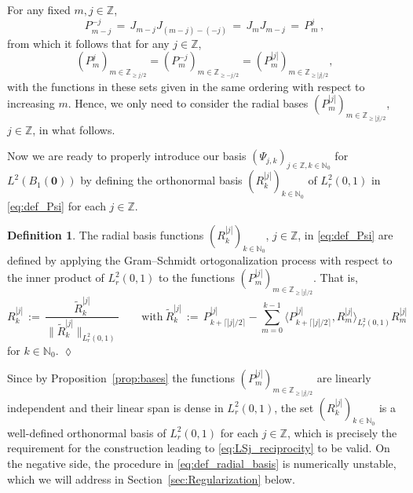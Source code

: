 \documentclass[11pt,a4paper]{article}
\theoremstyle{definition}
\newtheorem{definition}[theorem]{Definition}
\theoremstyle{remark} \newtheorem{remark}[theorem]{Remark}
\numberwithin{equation}{section}
\numberwithin{figure}{section}
\numberwithin{algorithm}{section}
\numberwithin{table}{section}
\newcommand{\field}[1]{{\mathbb{#1}}}
\newcommand{\N}{\field{N}}
\newcommand{\Z}{\field{Z}}
\newcommand{\bs}{\boldsymbol}
\newcommand{\bfzero}{{\bs 0}}
\begin{document}
For any fixed $m, j\in\Z$,
\begin{equation}
\label{eq:P_jm}
    P_{m-j}^{-j}
    \,=\,
    J_{m-j}J_{(m-j)-(-j)}
    \,=\,
    J_mJ_{m-j}
    \,=\,
    P_m^{j}\,,
\end{equation}
from which it follows that for any $j \in \Z$,
\begin{equation*}
\label{eq:lin_ependence_Pjm}
(P_{m}^{j} )_{m \in \Z_{\geq j/2}} = (P_{m}^{-j} )_{m \in \Z_{\geq -j/2}} = (P_{m}^{|j|})_{m \in \Z_{\geq |j|/2}},
\end{equation*}
with the functions in these sets given in the same ordering with respect to increasing $m$. Hence, we only need to consider the radial bases $(P_{m}^{|j|})_{m \in \Z_{\geq |j|/2}}$, $j \in \Z$, in what follows.

Now we are ready to properly introduce our basis $(\Psi_{j,k})_{j\in\Z,k\in\N_0}$ for $L^2(B_1(\bfzero))$ by defining the orthonormal basis $(R_k^{|j|})_{k \in \N_0}$  of $L^2_r(0,1)$ in \eqref{eq:def_Psi} for each $j \in \Z$. 

\begin{definition}
The radial basis functions $(R_k^{|j|})_{k \in \N_0}$, $j \in \Z$, in \eqref{eq:def_Psi} are defined by applying the Gram--Schmidt ortogonalization process with respect to the inner product of $L^2_r(0,1)$ to the functions $(P_{m}^{|j|})_{m \in \Z_{\geq |j|/2}}$. That is,
\begin{equation}
\label{eq:def_radial_basis}
  R_k^{|j|} \,:=\, \frac{\widetilde R_k^{|j|}}{\big \|\widetilde R_k^{|j|} \big \|_{L^2_r(0,1)}} 
    \qquad \text{with} \  \widetilde R_k^{|j|}
    \,:=\, P_{k+\lceil|j|/2\rceil}^{|j|} - \sum_{m=0}^{k-1} \big \langle P_{k+\lceil|j|/2\rceil}^{|j|},R_{m}^{|j|} \big \rangle_{L^2_r(0,1)}R_{m}^{|j|}
\end{equation}
for $k \in \N_0$.
\hfill$\lozenge$
\end{definition}

Since by Proposition~\ref{prop:bases} the functions $(P_{m}^{|j|})_{m \in \Z_{\geq |j|/2}}$ are linearly independent and their linear span is dense in $L^2_r(0,1)$, the set $(R_k^{|j|})_{k \in \N_0}$ is a well-defined orthonormal basis of $L^2_r(0,1)$ for each $j \in \Z$, which is precisely the requirement for the construction leading to \eqref{eq:LSj_reciprocity} to be valid. On the negative side, the procedure in \eqref{eq:def_radial_basis} is numerically unstable, which we will address in Section~\ref{sec:Regularization} below.
\end{document}
